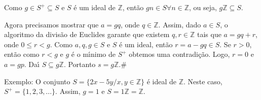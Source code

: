Como $g\in S^{+}\subseteq S$ e $S$ {\'e} um ideal de $\mathbb{Z}$, ent{\~a}o $gn\in S\forall n\in\mathbb{Z}$, ou seja, $g\mathbb{Z}\subseteq S$.

Agora precisamos mostrar que $a=gq$, onde $q\in\mathbb{Z}$. Assim, dado $a\in S$, o algoritmo da divis{\~a}o de Euclides garante que existem $q,r\in\mathbb{Z}$ tais que $a=gq+r$, onde $0\leq r<g$. Como $a,q,g\in S$ e $S$ {\'e} um ideal, ent{\~a}o $r=a-gq\in S$. Se $r>0$, ent{\~a}o como $r<g$ e $g$ {\'e} o m{\'\i}nimo de $S^{+}$ obtemos uma contradi{\c c}{\~a}o. Logo, $r=0$ e $a=gp$. Da{\'\i} $S\subseteq g\mathbb{Z}$. Portanto $s=g\mathbb{Z}$.\#

Exemplo: O conjunto $S=\{2x-5y/x,y\in\mathbb{Z}\}$ {\'e} ideal de $\mathbb{Z}$. Neste caso,\\ $S^{+}=\{1,2,3,...\}$. Assim, $g=1$ e $S=1\mathbb{Z}=\mathbb{Z}$.
